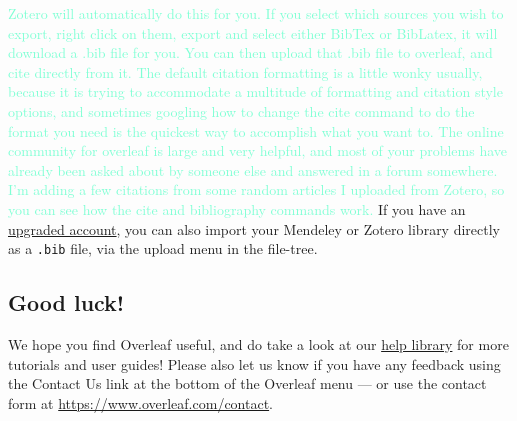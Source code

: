 \documentclass{article}
\begin{document}
\textcolor{Aquamarine}{Zotero will automatically do this for you. If you select which sources you wish to export, right click on them, export and select either BibTex or BibLatex, it will download a .bib file for you. You can then upload that .bib file to overleaf, and cite directly from it. The default citation formatting is a little wonky usually, because it is trying to accommodate a multitude of formatting and citation style options, and sometimes googling how to change the cite command to do the format you need is the quickest way to accomplish what you want to. The online community for overleaf is large and very helpful, and most of your problems have already been asked about by someone else and answered in a forum somewhere. I'm adding a few citations from some random articles I uploaded from Zotero, so you can see how the cite and bibliography commands work.} \cite{prieger_local_2023}
\cite{robb_capital_2014}
If you have an \href{https://www.overleaf.com/user/subscription/plans}{upgraded account}, you can also import your Mendeley or Zotero library directly as a \verb|.bib| file, via the upload menu in the file-tree.

\subsection{Good luck!}

We hope you find Overleaf useful, and do take a look at our \href{https://www.overleaf.com/learn}{help library} for more tutorials and user guides! Please also let us know if you have any feedback using the Contact Us link at the bottom of the Overleaf menu --- or use the contact form at \url{https://www.overleaf.com/contact}.



\end{document}
